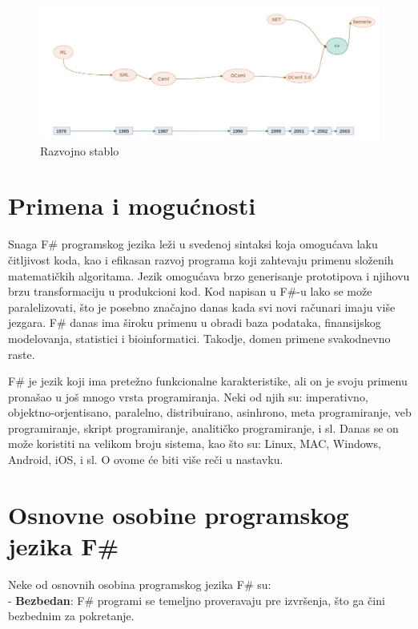 \documentclass[a4paper]{article}
\begin{document}
\begin{figure}[h!]
\begin{center}
\includegraphics[scale=0.29]{stablo.jpg}
\end{center}
\caption{Razvojno stablo}
\label{fig:stablo}
\end{figure}


\section{Primena i mogućnosti}
\label{sec:primena}

Snaga F\# programskog jezika leži u svedenoj sintaksi koja omogućava laku čitljivost koda, kao i efikasan razvoj programa koji zahtevaju primenu složenih matematičkih algoritama. Jezik omogućava brzo generisanje prototipova i njihovu brzu transformaciju u produkcioni kod. Kod napisan u F\#-u lako se može paralelizovati, što je posebno značajno danas kada svi novi računari imaju više jezgara. F\# danas ima široku primenu u obradi baza podataka, finansijskog modelovanja, statistici i bioinformatici. Takodje, domen primene svakodnevno raste.

F\# je jezik koji ima pretežno funkcionalne karakteristike, ali on je svoju primenu pronašao u još mnogo vrsta programiranja. Neki od njih su: imperativno, objektno-orjentisano, paralelno, distribuirano, asinhrono, meta programiranje, veb programiranje, skript programiranje, analitičko programiranje, i sl. Danas se on može koristiti na velikom broju sistema, kao što su: Linux, MAC, Windows, Android, iOS, i sl. O ovome će biti više reči u nastavku. 


\section{Osnovne osobine programskog jezika F\#}

Neke od osnovnih osobina programskog jezika F\# su:\\

	- \textbf{Bezbedan}: F\# programi se temeljno proveravaju pre izvršenja, što ga čini bezbednim za pokretanje.
\end{document}
